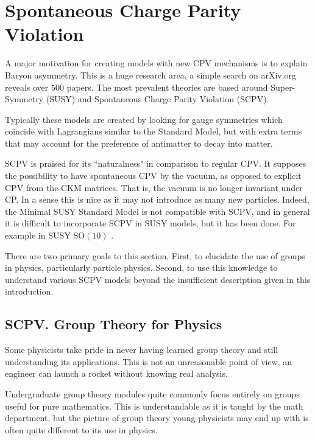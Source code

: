 \section{Spontaneous Charge Parity Violation} 
A major motivation for creating models with new CPV mechanisms is to explain Baryon asymmetry. This is a huge research area, a simple search on arXiv.org reveals over $500$ papers. The most prevalent theories are based around Super-Symmetry (SUSY) and Spontaneous Charge Parity Violation (SCPV). 

Typically these models are created by looking for gauge symmetries which coincide with Lagrangians similar to the Standard Model, but with extra terms that may account for the preference of antimatter to decay into matter.  

SCPV is praised for its ``naturalness" in comparison to regular CPV\cite{SCPV1}. It supposes the possibility to have spontaneous CPV by the vacuum, as opposed to explicit CPV from the CKM matrices. That is, the vacuum is no longer invariant under CP. In a sense this is nice as it may not introduce as many new particles. Indeed, the Minimal SUSY Standard Model is not compatible with SCPV, and in general it is difficult to incorporate SCPV in SUSY models\cite{SCPV1}, but it has been done. For example in SUSY $\mathrm{SO}(10)$ \cite{SCPV2}.

There are two primary goals to this section. First, to elucidate the use of groups in physics, particularly particle physics. Second, to use this knowledge to understand various SCPV  models beyond the insufficient description given in this introduction.

\subsection{SCPV. Group Theory for Physics}
Some physicists take pride in never having learned group theory and still understanding its applications. This is not an unreasonable point of view, an engineer can launch a rocket without knowing real analysis. 

Undergraduate group theory modules quite commonly focus entirely on groups useful for pure mathematics. This is understandable as it is taught by the math department, but the picture of group theory young physicists may end up with is often quite different to its use in physics.


